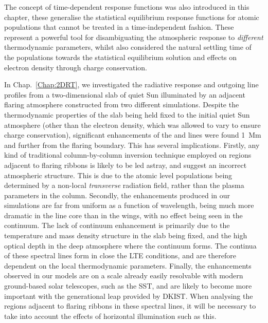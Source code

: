 The concept of time-dependent response functions was also introduced in this chapter, these generalise the statistical equilibrium response functions for atomic populations that cannot be treated in a time-independent fashion.
These represent a powerful tool for disambiguating the atmospheric response to \emph{different} thermodynamic parameters, whilst also considered the natural settling time of the populations towards the statistical equilibrium solution and effects on electron density through charge conservation.

In Chap.~\ref{Chap:2DRT}, we investigated the radiative response and outgoing line profiles from a two-dimensional slab of quiet Sun illuminated by an adjacent flaring atmosphere constructed from two different \Radyn{} simulations.
Despite the thermodynamic properties of the slab being held fixed to the initial quiet Sun atmosphere (other than the electron density, which was allowed to vary to ensure charge conservation), significant enhancements of the \Ha{} and \CaLine{} lines were found \SI{1}{\mega\m} and further from the flaring boundary.
This has several implications.
Firstly, any kind of traditional column-by-column inversion technique employed on regions adjacent to flaring ribbons is likely to be led astray, and suggest an incorrect atmospheric structure.
This is due to the atomic level populations being determined by a non-local \emph{transverse} radiation field, rather than the plasma parameters in the column.
Secondly, the enhancements produced in our simulations are far from uniform as a function of wavelength, being much more dramatic in the line core than in the wings, with no effect being seen in the continuum.
The lack of continuum enhancement is primarily due to the temperature and mass density structure in the slab being fixed, and the high optical depth in the deep atmosphere where the continuum forms.
The continua of these spectral lines form in close the LTE conditions, and are therefore dependent on the local thermodynamic parameters.
Finally, the enhancements observed in our models are on a scale already easily resolvable with modern ground-based solar telescopes, such as the SST, and are likely to become more important with the generational leap provided by DKIST.
When analysing the regions adjacent to flaring ribbons in these spectral lines, it will be necessary to take into account the effects of horizontal illumination such as this.

